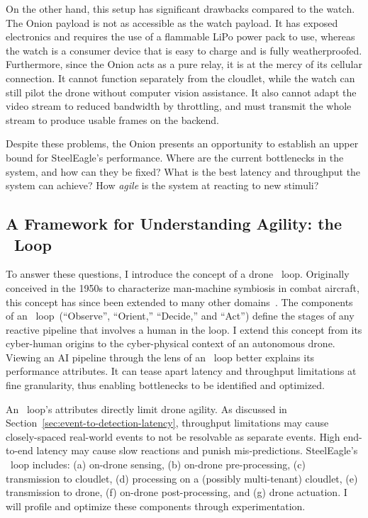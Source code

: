 On the other hand, this setup has significant drawbacks compared to the watch. The Onion payload is not as accessible as the watch payload. It has exposed electronics and requires the use of a flammable LiPo power pack to use, whereas the watch is a consumer device that is easy to charge and is fully weatherproofed. Furthermore, since the Onion acts as a pure relay, it is at the mercy of its cellular connection. It cannot function separately from the cloudlet, while the watch can still pilot the drone without computer vision assistance. It also cannot adapt the video stream to reduced bandwidth by throttling, and must transmit the whole stream to produce usable frames on the backend.

Despite these problems, the Onion presents an opportunity to establish an upper bound for SteelEagle's performance. Where are the current bottlenecks in the system, and how can they be fixed? What is the best latency and throughput the system can achieve? How \textit{agile} is the system at reacting to new stimuli?

\subsection{A Framework for Understanding Agility: the \ooda~Loop}
To answer these questions, I introduce the concept of a drone \ooda~loop. Originally conceived in the 1950s to characterize
man-machine symbiosis in combat aircraft, this concept has
since been extended to many other domains~\cite{Boyd1986, Blaha2018, Johnson2023}.  The components of an \ooda~loop~(``Observe'', ``Orient,'' ``Decide,'' and
``Act'') define the stages of any reactive pipeline that involves a
human in the loop.  I extend this concept from its
cyber-human origins to the cyber-physical context of an autonomous
drone.  Viewing an AI pipeline through the lens of an \ooda~loop better explains its performance attributes.  It can tease apart latency and throughput limitations at fine granularity, thus enabling bottlenecks to be identified and optimized.

An \ooda~loop's attributes directly limit drone agility.  As discussed in Section~\ref{sec:event-to-detection-latency}, throughput limitations may cause closely-spaced real-world events to not be
resolvable as separate events.  High end-to-end latency
may cause slow reactions and punish mis-predictions. SteelEagle's \ooda~loop includes: (a) on-drone sensing, (b) on-drone
pre-processing, (c) transmission to cloudlet, (d) processing on a
(possibly multi-tenant) cloudlet, (e) transmission to drone, (f)
on-drone post-processing, and (g) drone actuation. I will profile and optimize these components through experimentation.

